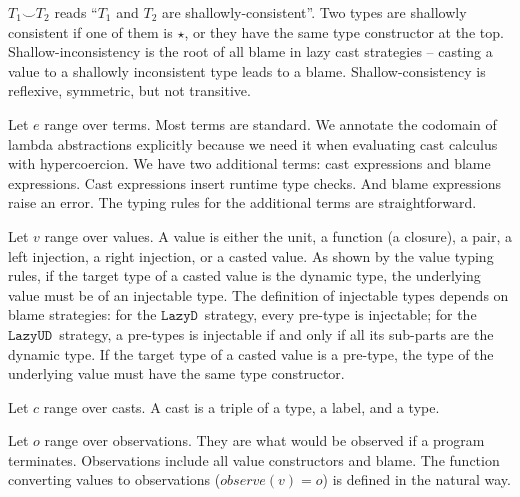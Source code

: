\documentclass[acmsmall,review,anonymous]{acmart}\settopmatter{printfolios=true,printccs=false,printacmref=false}
\newcommand{\lazyUD}{$\mathtt{Lazy UD}$}
\newcommand{\lazyD}{$\mathtt{Lazy D}$}
\begin{document}
$ T_1 \smile T_2 $ reads ``$ T_1 $ and $ T_2 $ are shallowly-consistent''. Two 
types are shallowly consistent if one of them is $ \star $, or they have the 
same type constructor at the top. Shallow-inconsistency is the root of all 
blame in lazy cast strategies -- casting a value to a shallowly inconsistent 
type leads to a blame. Shallow-consistency is reflexive, symmetric, but 
not transitive.

Let $ e $ range over terms. Most terms are standard. We annotate the codomain 
of lambda abstractions explicitly because we need it when evaluating cast 
calculus with hypercoercion. We have two additional terms: cast expressions and 
blame expressions. Cast expressions insert runtime type checks. And blame 
expressions raise an error. The typing rules for the additional terms are
straightforward.

Let $ v $ range over values. A value is either the unit, a function (a 
closure), a pair, a left injection, a right injection, or a 
casted value. As shown 
by the value typing rules, if the target type of a casted value is the dynamic 
type, the underlying value must be of an injectable type. The definition of 
injectable types depends on blame strategies: for the \lazyD\ strategy, every 
pre-type is injectable; for the \lazyUD\ strategy, a pre-types is injectable if 
and only if all its sub-parts are the dynamic type. If the target type of a 
casted value is a pre-type, the type of the underlying value must have the same 
type constructor.

Let $ c $ range over casts. A cast is a triple of a type, a label, and a type.

Let $ o $ range over observations. They are what would be observed if a 
program terminates. Observations include all value constructors and blame.
The function converting values to observations ($ observe(v) = o $) is defined 
in the natural way.
\end{document}
